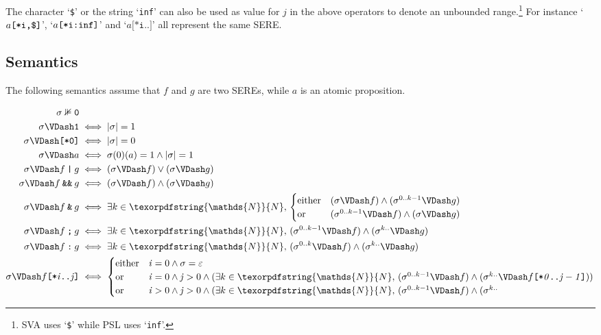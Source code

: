 \documentclass[a4paper,twoside,10pt,DIV=12]{scrreprt}
\newcommand{\N}{\texorpdfstring{\ensuremath{\mathds{N}}}{N}}
\newcommand{\OR}{\mathbin{\texttt{|}}}
\newcommand{\AND}{\mathbin{\texttt{\&}}}
\newcommand{\ANDALT}{\mathbin{\texttt{\&\&}}}
\newcommand{\FUSION}{\mathbin{\texttt{:}}}
\newcommand{\CONCAT}{\mathbin{\texttt{;}}}
\newcommand{\0}{\texttt{0}}
\newcommand{\1}{\texttt{1}}
\newcommand{\STAR}[1]{\texttt{[*#1]}}
\newcommand{\eword}{\texttt{[*0]}}
\newcommand\mvar[1]{\ensuremath{\mathit{#1}}}
\newcommand\samp[1]{`\texttt{#1}'}
\begin{document}

The character \samp{\$} or the string \samp{inf} can also be used as
value for $\mvar{j}$ in the above operators to denote an unbounded
range.\footnote{SVA uses \samp{\$} while PSL uses \samp{inf}.}  For
instance `$a\STAR{i,\texttt{\$}}$', `$a\STAR{i\texttt{:inf}}$' and
`$a\STAR{i..}$' all represent the same SERE.

\subsection{Semantics}

The following semantics assume that $f$ and $g$ are two SEREs, while
$a$ is an atomic proposition.

{\allowdisplaybreaks
\begin{align*}
  \sigma\nVDash \0    &\\
  \sigma\VDash \1     & \iff |\sigma|=1\\
  \sigma\VDash \eword & \iff |\sigma|=0 \\
  \sigma\VDash a      & \iff \sigma(0)(a)=1 \land |\sigma|=1\\
  \sigma\VDash f\OR g &\iff (\sigma\VDash f) \lor (\sigma\VDash g) \\
  \sigma\VDash f\ANDALT g &\iff (\sigma \VDash f) \land (\sigma\VDash g) \\
  \sigma\VDash f\AND g &\iff \exists k\in\N,\,
  \begin{cases}
    \text{either} &(\sigma \VDash f) \land (\sigma^{0..k-1} \VDash g)\\
    \text{or} &(\sigma^{0..k-1} \VDash f) \land (\sigma \VDash g)
  \end{cases} \\
  \sigma\VDash f\CONCAT g&\iff \exists k\in\N,\,(\sigma^{0..k-1} \VDash f)\land(\sigma^{k..} \VDash g)\\
  \sigma\VDash f\FUSION g&\iff \exists k\in\N,\,(\sigma^{0..k} \VDash f)\land(\sigma^{k..} \VDash g)\\
  \sigma\VDash f\STAR{\mvar{i}..\mvar{j}}& \iff
  \begin{cases}
    \text{either} & \mvar{i}=0 \land \sigma=\varepsilon \\
    \text{or} & \mvar{i}=0 \land \mvar{j}>0 \land (\exists k\in\N,\,
      (\sigma^{0..k-1}\VDash f) \land (\sigma^{k..}
      \VDash f\STAR{\mvar{0}..\mvar{j-1}}))\\
    \text{or} & \mvar{i}>0 \land \mvar{j}>0 \land (\exists k\in\N,\,
      (\sigma^{0..k-1}\VDash f) \land (\sigma^{k..}

\end{cases}
\end{align*}}
\end{document}
